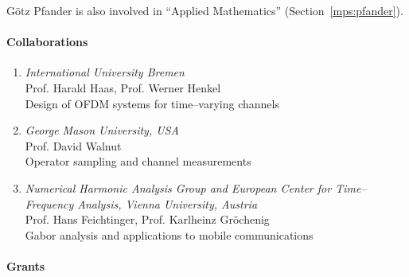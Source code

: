 %
%
%
%
%

\null G\"otz Pfander is also involved in  ``Applied Mathematics''
(Section~\ref{mps:pfander}).

\paragraph{Collaborations}
\begin{enumerate}
    \item {\sl International University Bremen}\\
          Prof. Harald Haas, Prof. Werner Henkel\\
          Design of OFDM systems for time--varying channels
    \item {\sl George Mason University, USA}\\
          Prof. David Walnut\\
          Operator sampling and channel measurements
    \item {\sl Numerical Harmonic Analysis Group and European Center
          for Time--Frequency Analysis, Vienna University, Austria}\\
          Prof. Hans Feichtinger, Prof. Karlheinz Gr\"ochenig\\
          Gabor analysis and applications to mobile communications
\end{enumerate}

\newpage
\paragraph{Grants}

